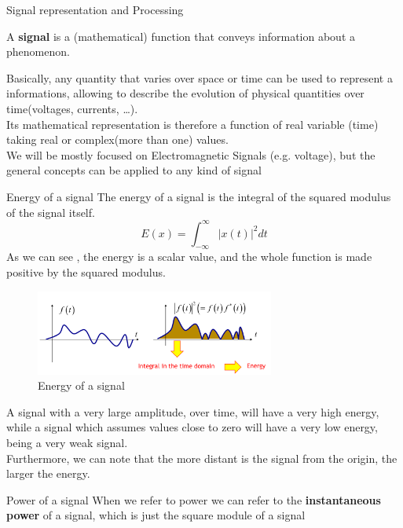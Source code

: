 \begin{section}{Signal representation and Processing}
  \begin{boxH}
    A \textbf{signal} is a (mathematical) function that conveys information about a phenomenon.
  \end{boxH}
  Basically, any quantity that varies over space or time can be used to represent a informations,
  allowing to describe the evolution of physical quantities over time(voltages, currents, \dots).\\
  Its mathematical representation is therefore a function of real variable (time) taking real or 
  complex(more than one) values.\\
  We will be mostly focused on Electromagnetic Signals (e.g. voltage), but the general concepts 
  can be applied to any kind of signal
  \begin{subsection}{Energy of a signal}
    The energy of a signal is the integral of the squared modulus of the signal itself.
    \begin{equation}
      E(x) = \int_{-\infty}^{\infty} |x(t)|^2 dt
    \end{equation}
    As we can see , the energy is a scalar value, and the whole function is made positive by the
    squared modulus.\\
    \begin{figure}[h]
      \centering
      \includegraphics[width=0.7\textwidth]{img/energy signal.png}
      \caption{Energy of a signal}
      \label{fig:Energy of a signal}
    \end{figure}
    A signal with a very large amplitude, over time, will have a very high energy, while a signal
    which assumes values close to zero will have a very low energy, being a very weak signal.\\
    Furthermore, we can note that the more distant is the signal from the origin, the larger the energy.
  \end{subsection}
  \begin{subsection}{Power of a signal}
    When we refer to power we can refer to the \textbf{instantaneous power} of a signal, which is just the 
    square module of a signal
    \begin{equation}

\end{equation}
\end{subsection}
\end{section}
